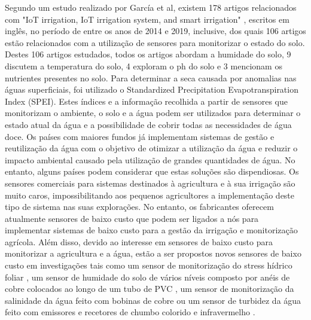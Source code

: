 \documentclass[conference]{IEEEtran}
\begin{document}
Segundo um estudo realizado por García et al, existem 178 artigos 
relacionados com  "IoT irrigation, IoT irrigation system, and smart 
irrigation" \cite{garcia2020iot}, escritos em inglês, no período de entre os 
anos de 2014 e 2019, inclusive, dos quais 106 artigos estão relacionados com a 
utilização de sensores para monitorizar o estado do solo. Destes 106 artigos 
estudados, todos os artigos abordam a humidade do solo, 9 discutem a temperatura 
do solo, 4 exploram o ph do solo e 3 mencionam os nutrientes presentes no solo. 
Para determinar a seca causada por anomalias nas águas superficiais, 
foi utilizado o Standardized Precipitation Evapotranspiration Index (SPEI). 
Estes índices e a informação recolhida a partir de sensores que monitorizam o ambiente, 
o solo e a água podem ser utilizados para determinar o estado atual da água e a 
possibilidade de cobrir todas as necessidades de água doce. Os países com maiores 
fundos já implementam sistemas de gestão e reutilização da água com o objetivo de 
otimizar a utilização da água e reduzir o impacto ambiental causado pela utilização 
de grandes quantidades de água. No entanto, alguns países podem considerar que estas 
soluções são dispendiosas. 
Os sensores comerciais para sistemas destinados à agricultura e à sua irrigação 
são muito caros, impossibilitando aos pequenos agricultores a implementação deste 
tipo de sistema nas suas explorações. No entanto, os fabricantes oferecem atualmente 
sensores de baixo custo que podem ser ligados a nós para implementar sistemas de baixo 
custo para a gestão da irrigação e monitorização agrícola. Além disso, devido ao interesse 
em sensores de baixo custo para monitorizar a agricultura e a água, estão a ser propostos 
novos sensores de baixo custo em investigações tais como um sensor de monitorização do 
stress hídrico foliar \cite{daskalakis2018}, um sensor de humidade do solo de vários níveis composto 
por anéis de cobre colocados ao longo de um tubo de PVC \cite{guruprasadh2017intelligent}, 
um sensor de monitorização da salinidade da água feito com bobinas de 
cobre \cite{parra2013low} ou um sensor de turbidez da água 
feito com emissores e recetores de chumbo colorido e infravermelho \cite{sendra2013low}.
\end{document}

